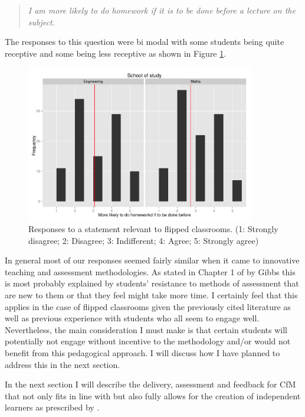 \documentclass{article}
\begin{document}
\begin{itemize}
\begin{quotation}
\textit{I am more likely to do homework if it is to be done before a lecture on the subject.}
\end{quotation}

The responses to this question were bi modal with some students being quite receptive and some being less receptive as shown in Figure \ref{morelikelytodohomeworkbeforelecture}.

\begin{figure}[htdp]
\begin{center}
\includegraphics[width=10cm]{./Images/morelikelytodohomeworkbeforelecture.pdf}
\end{center}
\caption{Responses to a statement relevant to flipped classrooms. (1: Strongly disagree; 2: Disagree; 3: Indifferent; 4: Agree; 5: Strongly agree)}\label{morelikelytodohomeworkbeforelecture}
\end{figure}

In general most of our responses seemed fairly similar when it came to innovative teaching and assessment methodologies. As stated in Chapter 1 of \cite{bryan_innovative_2006} by Gibbs this is most probably explained by students' resistance to methods of assessment that are new to them or that they feel might take more time. I certainly feel that this applies in the case of flipped classrooms given the previously cited literature as well as previous experience with students who all seem to engage well. Nevertheless, the main consideration I must make is that certain students will potentially not engage without incentive to the methodology and/or would not benefit from this pedagogical approach. I will discuss how I have planned to address this in the next section.
\end{itemize}

In the next section I will describe the delivery, assessment and feedback for CfM that not only fits in line with \cite{cardiff_university_cardiff_2013} but also fully allows for the creation of independent learners as prescribed by \cite{cardiff_university_way_2013}.
\end{document}
